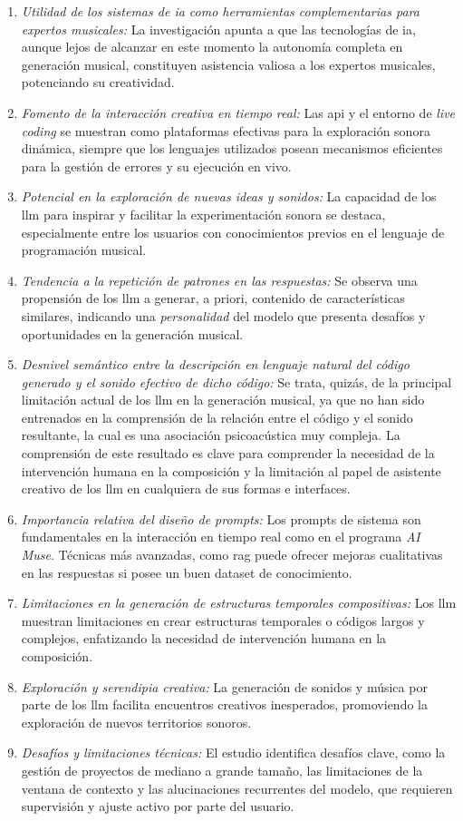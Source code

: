 \begin{enumerate}
    \item \textit{Utilidad de los sistemas de \gls{ia} como herramientas complementarias para expertos musicales:} La investigación apunta a que las tecnologías de \gls{ia}, aunque lejos de alcanzar en este momento la autonomía completa en generación musical, constituyen asistencia valiosa a los expertos musicales, potenciando su creatividad.
    \item \textit{Fomento de la interacción creativa en tiempo real:} Las \gls{api} y el entorno de \emph{live coding} se muestran como plataformas efectivas para la exploración sonora dinámica, siempre que los lenguajes utilizados posean mecanismos eficientes para la gestión de errores y su ejecución en vivo.
    \item \textit{Potencial en la exploración de nuevas ideas y sonidos:} La capacidad de los \gls{llm} para inspirar y facilitar la experimentación sonora se destaca, especialmente entre los usuarios con conocimientos previos en el lenguaje de programación musical.
    \item \textit{Tendencia a la repetición de patrones en las respuestas:} Se observa una propensión de los \gls{llm} a generar, a priori, contenido de características similares, indicando una \emph{personalidad} del modelo que presenta desafíos y oportunidades en la generación musical.
    \item \textit{Desnivel semántico entre la descripción en lenguaje natural del código generado y el sonido efectivo de dicho código:} Se trata, quizás, de la principal limitación actual de los \gls{llm} en la generación musical, ya que no han sido entrenados en la comprensión de la relación entre el código y el sonido resultante, la cual es una asociación psicoacústica muy compleja. La comprensión de este resultado es clave para comprender la necesidad de la intervención humana en la composición y la limitación al papel de asistente creativo de los \gls{llm} en cualquiera de sus formas e interfaces.
    \item \textit{Importancia relativa del diseño de prompts:} Los prompts de sistema son fundamentales en la interacción en tiempo real como en el programa \emph{AI Muse}. Técnicas más avanzadas, como \gls{rag} puede ofrecer mejoras cualitativas en las respuestas si posee un buen dataset de conocimiento. 
    \item \textit{Limitaciones en la generación de estructuras temporales compositivas:} Los \gls{llm} muestran limitaciones en crear estructuras temporales o códigos largos y complejos, enfatizando la necesidad de intervención humana en la composición.
    \item \textit{Exploración y serendipia creativa:} La generación de sonidos y música por parte de los \gls{llm} facilita encuentros creativos inesperados, promoviendo la exploración de nuevos territorios sonoros.
    \item \textit{Desafíos y limitaciones técnicas:} El estudio identifica desafíos clave, como la gestión de proyectos de mediano a grande tamaño, las limitaciones de la ventana de contexto y las alucinaciones recurrentes del modelo, que requieren supervisión y ajuste activo por parte del usuario.


\end{enumerate}
